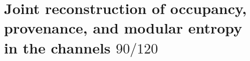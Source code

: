 \section{Joint reconstruction of occupancy, provenance, and modular entropy in the channels \(90/120\)}

